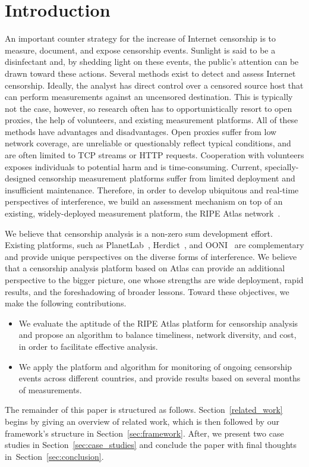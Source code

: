 \section{Introduction}
An important counter strategy for the increase of Internet censorship is to
measure, document, and expose censorship events.  Sunlight is said to be a
disinfectant and, by shedding light on these events, the public's attention can
be drawn toward these actions.  Several methods exist to detect and assess
Internet censorship.  Ideally, the analyst has direct control over a censored
source host that can perform measurements against an uncensored destination.
This is typically not the case, however, so research often has to
opportunistically resort to open proxies, the help of volunteers, and existing
measurement platforms.  All of these methods have advantages and disadvantages.
Open proxies suffer from low network coverage, are unreliable or questionably
reflect typical conditions, and are often limited to TCP streams or HTTP
requests.  Cooperation with volunteers exposes individuals to potential harm
and is time-consuming.  Current, specially-designed censorship measurement
platforms suffer from limited deployment and insufficient maintenance.
Therefore, in order to develop ubiquitous and real-time perspectives of
interference, we build an assessment mechanism on top of an existing,
widely-deployed measurement platform, the RIPE Atlas network~\cite{atlas}.

We believe that censorship analysis is a non-zero sum development effort.
Existing platforms, such as PlanetLab~\cite{planetlab}, Herdict~\cite{Herdict},
and OONI~\cite{Filasto2012} are complementary and provide unique perspectives
on the diverse forms of interference.  We believe that a censorship analysis
platform based on Atlas can provide an additional perspective to the bigger
picture, one whose strengths are wide deployment, rapid results, and the
foreshadowing of broader lessons.  Toward these objectives, we make the
following contributions.

\begin{itemize}
	\item We evaluate the aptitude of the RIPE Atlas platform for censorship
		analysis and propose an algorithm to balance timeliness, network
		diversity, and cost, in order to facilitate effective analysis.
	\item We apply the platform and algorithm for monitoring of ongoing
		censorship events across different countries, and provide results based
		on several months of measurements.
\end{itemize}

The remainder of this paper is structured as follows.
Section~\ref{related_work} begins by giving an overview of related work, which
is then followed by our framework's structure in
Section~\ref{sec:framework}.  After, we present two case studies in
Section~\ref{sec:case_studies} and conclude the paper with final thoughts
in~Section~\ref{sec:conclusion}.
